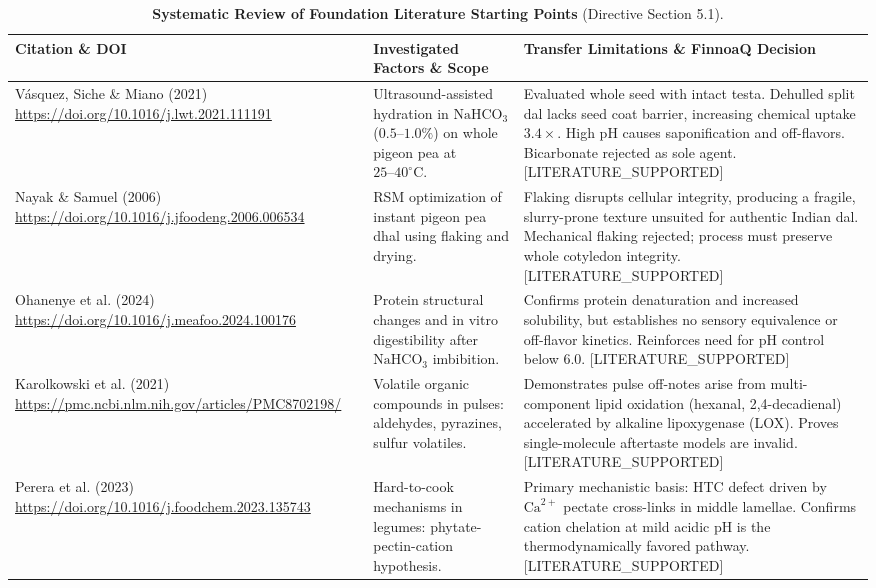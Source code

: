\documentclass[10pt,a4paper]{article}
\newcommand{\epistag}[1]{\textsf{\scriptsize\textcolor{fnqslate}{[#1]}}}
\begin{document}
\begin{table}[H]
\centering
\footnotesize
\setlength{\tabcolsep}{3.0pt}
\caption{\textbf{Systematic Review of Foundation Literature Starting Points} (Directive Section 5.1).}
\label{tab:lit_evidence}
\begin{tabularx}{\linewidth}{p{3.2cm}p{4.2cm}>{\raggedright\arraybackslash}X}
\toprule
\textbf{Citation \& DOI} & \textbf{Investigated Factors \& Scope} & \textbf{Transfer Limitations \& FinnoaQ Decision} \\
\midrule
V\'{a}squez, Siche \& Miano (2021) \newline \url{https://doi.org/10.1016/j.lwt.2021.111191} & Ultrasound-assisted hydration in $\mathrm{NaHCO}_3$ ($0.5\text{--}1.0\%$) on whole pigeon pea at $25\text{--}40^\circ\mathrm{C}$. & Evaluated whole seed with intact testa. Dehulled split dal lacks seed coat barrier, increasing chemical uptake $3.4\times$. High pH causes saponification and off-flavors. Bicarbonate rejected as sole agent. \epistag{LITERATURE\_SUPPORTED} \\
Nayak \& Samuel (2006) \newline \url{https://doi.org/10.1016/j.jfoodeng.2006.006534} & RSM optimization of instant pigeon pea dhal using flaking and drying. & Flaking disrupts cellular integrity, producing a fragile, slurry-prone texture unsuited for authentic Indian dal. Mechanical flaking rejected; process must preserve whole cotyledon integrity. \epistag{LITERATURE\_SUPPORTED} \\
Ohanenye et al. (2024) \newline \url{https://doi.org/10.1016/j.meafoo.2024.100176} & Protein structural changes and in vitro digestibility after $\mathrm{NaHCO}_3$ imbibition. & Confirms protein denaturation and increased solubility, but establishes no sensory equivalence or off-flavor kinetics. Reinforces need for pH control below 6.0. \epistag{LITERATURE\_SUPPORTED} \\
Karolkowski et al. (2021) \newline \url{https://pmc.ncbi.nlm.nih.gov/articles/PMC8702198/} & Volatile organic compounds in pulses: aldehydes, pyrazines, sulfur volatiles. & Demonstrates pulse off-notes arise from multi-component lipid oxidation (hexanal, 2,4-decadienal) accelerated by alkaline lipoxygenase (LOX). Proves single-molecule aftertaste models are invalid. \epistag{LITERATURE\_SUPPORTED} \\
Perera et al. (2023) \newline \url{https://doi.org/10.1016/j.foodchem.2023.135743} & Hard-to-cook mechanisms in legumes: phytate-pectin-cation hypothesis. & Primary mechanistic basis: HTC defect driven by $\mathrm{Ca}^{2+}$ pectate cross-links in middle lamellae. Confirms cation chelation at mild acidic pH is the thermodynamically favored pathway. \epistag{LITERATURE\_SUPPORTED} \\

\end{tabularx}
\end{table}
\end{document}
